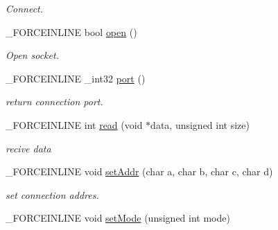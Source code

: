 \begin{DoxyCompactItemize}
\begin{DoxyCompactList}\small\item\em Connect. \end{DoxyCompactList}\item 
\hypertarget{classcsad_1_1_net_connection_a66b082952ef88366496a30331f13c3a9}{\-\_\-\-F\-O\-R\-C\-E\-I\-N\-L\-I\-N\-E bool \hyperlink{classcsad_1_1_net_connection_a66b082952ef88366496a30331f13c3a9}{open} ()}\label{classcsad_1_1_net_connection_a66b082952ef88366496a30331f13c3a9}

\begin{DoxyCompactList}\small\item\em Open socket. \end{DoxyCompactList}\item 
\hypertarget{classcsad_1_1_net_connection_acb26734ada988518925467b18447d54e}{\-\_\-\-F\-O\-R\-C\-E\-I\-N\-L\-I\-N\-E \-\_\-int32 \hyperlink{classcsad_1_1_net_connection_acb26734ada988518925467b18447d54e}{port} ()}\label{classcsad_1_1_net_connection_acb26734ada988518925467b18447d54e}

\begin{DoxyCompactList}\small\item\em return connection port. \end{DoxyCompactList}\item 
\hypertarget{classcsad_1_1_net_connection_aff8bdebec5c06a7667f196d25584ba9e}{\-\_\-\-F\-O\-R\-C\-E\-I\-N\-L\-I\-N\-E int \hyperlink{classcsad_1_1_net_connection_aff8bdebec5c06a7667f196d25584ba9e}{read} (void $\ast$data, unsigned int size)}\label{classcsad_1_1_net_connection_aff8bdebec5c06a7667f196d25584ba9e}

\begin{DoxyCompactList}\small\item\em recive data \end{DoxyCompactList}\item 
\hypertarget{classcsad_1_1_net_connection_a29b59fc5dd401fff7f4cc5e898ba1bef}{\-\_\-\-F\-O\-R\-C\-E\-I\-N\-L\-I\-N\-E void \hyperlink{classcsad_1_1_net_connection_a29b59fc5dd401fff7f4cc5e898ba1bef}{set\-Addr} (char a, char b, char c, char d)}\label{classcsad_1_1_net_connection_a29b59fc5dd401fff7f4cc5e898ba1bef}

\begin{DoxyCompactList}\small\item\em set connection addres. \end{DoxyCompactList}\item 
\hypertarget{classcsad_1_1_net_connection_a1c1000c61de1d3e97400eebbe7290726}{\-\_\-\-F\-O\-R\-C\-E\-I\-N\-L\-I\-N\-E void \hyperlink{classcsad_1_1_net_connection_a1c1000c61de1d3e97400eebbe7290726}{set\-Mode} (unsigned int mode)}\label{classcsad_1_1_net_connection_a1c1000c61de1d3e97400eebbe7290726}


\end{DoxyCompactItemize}
